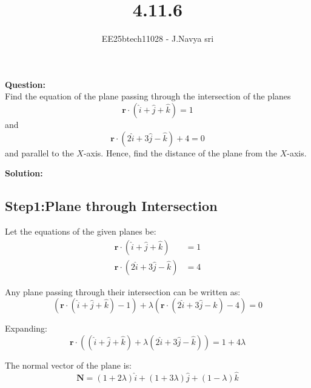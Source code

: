 \documentclass[journal]{IEEEtran}
\begin{document}

\vspace{3cm}

\title{4.11.6}
\author{EE25btech11028 - J.Navya sri}
{\let\newpage\relax\maketitle}

\textbf{Question:} \\
   Find the equation of the plane passing through the intersection of the planes 
\[
\mathbf{r}\cdot (\hat{i} + \hat{j} + \hat{k}) = 1
\]
and 
\[
\mathbf{r} \cdot (2\hat{i} + 3\hat{j} - \hat{k}) + 4 = 0
\]
and parallel to the $X$-axis. Hence, find the distance of the plane from the $X$-axis.
 
\bigskip
\textbf{Solution:}

\subsection*{Step1:Plane through Intersection}
Let the equations of the given planes be:
\begin{align}
\mathbf{r}  \cdot (\hat{i} + \hat{j} + \hat{k}) &= 1 \label{eq:plane1} \\
\mathbf{r} \cdot (2\hat{i} + 3\hat{j} - \hat{k}) &= 4 \label{eq:plane2}
\end{align}

Any plane passing through their intersection can be written as:
\begin{equation}
\left( \mathbf{r}  \cdot (\hat{i} + \hat{j} + \hat{k}) - 1\right) + \lambda \left(\mathbf{r}  \cdot (2\hat{i} + 3\hat{j} - \hat{k}) - 4 \right) = 0
\label{eq:intersect_plane}
\end{equation}

Expanding:
\begin{equation}
\mathbf{r}  \cdot \left( (\hat{i} + \hat{j} + \hat{k}) + \lambda (2\hat{i} + 3\hat{j} - \hat{k}) \right) = 1 + 4\lambda
\label{eq:expanded}
\end{equation}

The normal vector of the plane is:
\begin{equation}
\mathbf{N} = (1 + 2\lambda)\hat{i} + (1 + 3\lambda)\hat{j} + (1 - \lambda) \hat{k}
\label{eq:normal}
\end{equation}
\end{document}
